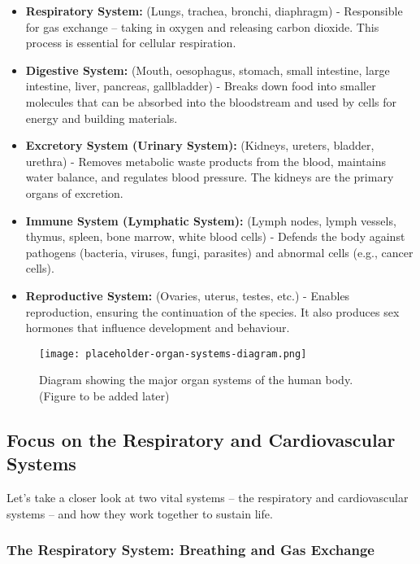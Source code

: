 \begin{itemize}
    \item \textbf{Respiratory System:} (Lungs, trachea, bronchi, diaphragm) -  Responsible for gas exchange – taking in oxygen and releasing carbon dioxide.  This process is essential for cellular respiration.

    \item \textbf{Digestive System:} (Mouth, oesophagus, stomach, small intestine, large intestine, liver, pancreas, gallbladder) - Breaks down food into smaller molecules that can be absorbed into the bloodstream and used by cells for energy and building materials.

    \item \textbf{Excretory System (Urinary System):} (Kidneys, ureters, bladder, urethra) - Removes metabolic waste products from the blood, maintains water balance, and regulates blood pressure. The kidneys are the primary organs of excretion.

    \item \textbf{Immune System (Lymphatic System):} (Lymph nodes, lymph vessels, thymus, spleen, bone marrow, white blood cells) - Defends the body against pathogens (bacteria, viruses, fungi, parasites) and abnormal cells (e.g., cancer cells).

    \item \textbf{Reproductive System:} (Ovaries, uterus, testes, etc.) -  Enables reproduction, ensuring the continuation of the species.  It also produces sex hormones that influence development and behaviour.

\end{itemize}

\begin{figure}[htbp]
    \centering
    \texttt{[image: placeholder-organ-systems-diagram.png]}
    \caption{Diagram showing the major organ systems of the human body. (Figure to be added later)}
    \label{fig:organsystems}
\end{figure}

\subsection{Focus on the Respiratory and Cardiovascular Systems}

Let's take a closer look at two vital systems – the respiratory and cardiovascular systems – and how they work together to sustain life.

\subsubsection{The Respiratory System: Breathing and Gas Exchange}

